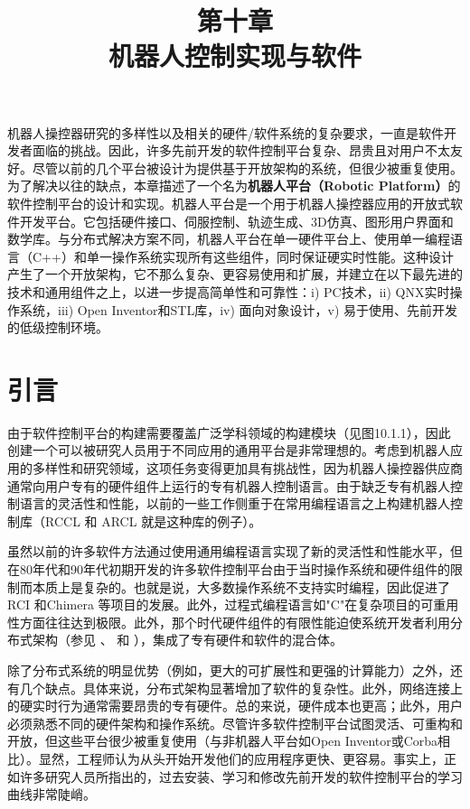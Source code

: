 \documentclass[UTF8,a4paper,12pt]{ctexart}
\title{\textbf{第十章} \\ \vspace{0.5cm} 机器人控制实现与软件}
\author{}
\date{}
\begin{document}
  \maketitle
\fi

机器人操控器研究的多样性以及相关的硬件/软件系统的复杂要求，一直是软件开发者面临的挑战。因此，许多先前开发的软件控制平台复杂、昂贵且对用户不太友好。尽管以前的几个平台被设计为提供基于开放架构的系统，但很少被重复使用。为了解决以往的缺点，本章描述了一个名为\textbf{机器人平台（Robotic Platform）}的软件控制平台的设计和实现。机器人平台是一个用于机器人操控器应用的开放式软件开发平台。它包括硬件接口、伺服控制、轨迹生成、3D仿真、图形用户界面和数学库。与分布式解决方案不同，机器人平台在单一硬件平台上、使用单一编程语言（C++）和单一操作系统实现所有这些组件，同时保证硬实时性能。这种设计产生了一个开放架构，它不那么复杂、更容易使用和扩展，并建立在以下最先进的技术和通用组件之上，以进一步提高简单性和可靠性：i) PC技术，ii) QNX实时操作系统，iii) Open Inventor和STL库，iv) 面向对象设计，v) 易于使用、先前开发的低级控制环境。

\section{引言}

由于软件控制平台的构建需要覆盖广泛学科领域的构建模块（见图10.1.1），因此创建一个可以被研究人员用于不同应用的通用平台是非常理想的。考虑到机器人应用的多样性和研究领域，这项任务变得更加具有挑战性，因为机器人操控器供应商通常向用户专有的硬件组件上运行的专有机器人控制语言。由于缺乏专有机器人控制语言的灵活性和性能，以前的一些工作侧重于在常用编程语言之上构建机器人控制库（RCCL \cite{Lloyd1988} 和 ARCL \cite{Corke} 就是这种库的例子）。

虽然以前的许多软件方法通过使用通用编程语言实现了新的灵活性和性能水平，但在80年代和90年代初期开发的许多软件控制平台由于当时操作系统和硬件组件的限制而本质上是复杂的。也就是说，大多数操作系统不支持实时编程，因此促进了RCI \cite{Lloyd1990} 和Chimera \cite{Stewart1989} 等项目的发展。此外，过程式编程语言如"C"在复杂项目的可重用性方面往往达到极限。此外，那个时代硬件组件的有限性能迫使系统开发者利用分布式架构（参见 \cite{Miller1991}、\cite{Kapoor1996} 和 \cite{Pelich1996}），集成了专有硬件和软件的混合体。

除了分布式系统的明显优势（例如，更大的可扩展性和更强的计算能力）之外，还有几个缺点。具体来说，分布式架构显著增加了软件的复杂性。此外，网络连接上的硬实时行为通常需要昂贵的专有硬件。总的来说，硬件成本也更高；此外，用户必须熟悉不同的硬件架构和操作系统。尽管许多软件控制平台试图灵活、可重构和开放，但这些平台很少被重复使用（与非机器人平台如Open Inventor或Corba相比）。显然，工程师认为从头开始开发他们的应用程序更快、更容易。事实上，正如许多研究人员所指出的，过去安装、学习和修改先前开发的软件控制平台的学习曲线非常陡峭。
\end{document}
